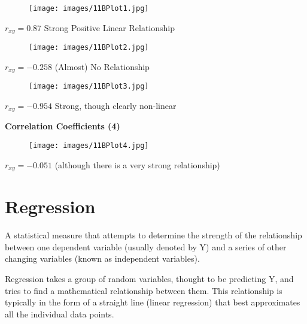 \documentclass[]{report}
\begin{document}
\begin{figure}
	\texttt{[image: images/11BPlot1.jpg]}\\
	
\end{figure}
$r_{xy} = 0.87$ Strong Positive Linear Relationship



\begin{figure}
	\texttt{[image: images/11BPlot2.jpg]}\\
	
\end{figure}

$r_{xy} = -0.258$ (Almost) No Relationship


\begin{figure}
	\texttt{[image: images/11BPlot3.jpg]}\\
	
\end{figure}

$r_{xy} = -0.954$ Strong, though clearly non-linear



\textbf{Correlation Coefficients (4) }
\begin{figure}
	\texttt{[image: images/11BPlot4.jpg]}\\
	
\end{figure}
$r_{xy} =  -0.051$ (although there is a very strong
relationship)

\newpage
\section{Regression}
A statistical measure that attempts to determine the strength of the relationship between one dependent variable
(usually denoted by Y) and a series of other changing variables (known as independent variables).

Regression takes a group of random variables, thought to be predicting Y, and tries to find a mathematical relationship between them. This relationship is typically in the form of a straight line (linear regression) that best approximates all the individual data points.
\end{document}

